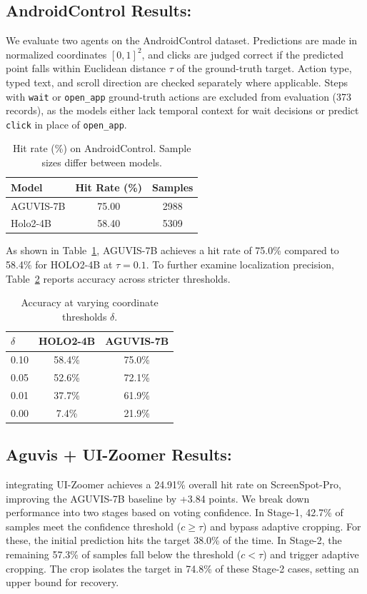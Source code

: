 \documentclass{article}
\theoremstyle{plain}
\theoremstyle{definition}
\theoremstyle{remark}
\begin{document}
\subsection{AndroidControl Results:}
We evaluate two agents on the AndroidControl dataset. Predictions are made in normalized
coordinates $[0,1]^2$, and clicks are judged correct if the predicted point falls within
Euclidean distance $\tau$ of the ground-truth target. Action type, typed text,
and scroll direction are checked separately where applicable. Steps with \texttt{wait} or \texttt{open\_app}
ground-truth actions are excluded from evaluation (373 records), as the models either
lack temporal context for wait decisions or predict \texttt{click} in place of
\texttt{open\_app}.

\begin{table}[h]
    \centering
    \caption{Hit rate (\%) on AndroidControl. Sample sizes differ between models.}
    \label{tab:androidcontrol}
    \begin{tabular}{lcc}
    \toprule
    \textbf{Model} & \textbf{Hit Rate (\%)} & \textbf{Samples} \\
    \midrule
    AGUVIS-7B  & 75.00 & 2988  \\
    Holo2-4B   & 58.40 & 5309 \\
    \bottomrule
    \end{tabular}
\end{table}
As shown in Table~\ref{tab:androidcontrol}, AGUVIS-7B achieves a hit rate of 75.0\%
compared to 58.4\% for HOLO2-4B at $\tau{=}0.1$. To further examine localization
precision, Table~\ref{tab:accuracy} reports accuracy across stricter thresholds.

\begin{table}[h]
\centering
\caption{Accuracy at varying coordinate thresholds $\delta$.}
\label{tab:accuracy}
\begin{tabular}{lcc}
\toprule
$\delta$ & HOLO2-4B & AGUVIS-7B \\
\midrule
0.10 & 58.4\% & 75.0\% \\
0.05 & 52.6\% & 72.1\% \\
0.01 & 37.7\% & 61.9\% \\
0.00 & 7.4\%  & 21.9\% \\
\bottomrule
\end{tabular}
\end{table}


\subsection{Aguvis + UI-Zoomer Results:} 
integrating UI-Zoomer achieves a 24.91\% overall hit rate on ScreenSpot-Pro, improving the AGUVIS-7B baseline by +3.84 points. We break down performance into two stages based on voting confidence. In Stage-1, 42.7\% of samples meet the confidence threshold ($c \geq \tau$) and bypass adaptive cropping. For these, the initial prediction hits the target 38.0\% of the time. In Stage-2, the remaining 57.3\% of samples fall below the threshold ($c < \tau$) and trigger adaptive cropping. The crop isolates the target in 74.8\% of these Stage-2 cases, setting an upper bound for recovery. 
\end{document}
